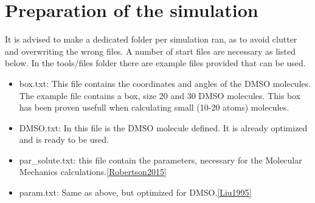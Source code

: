 \documentclass[a4paper,fleqn]{report}
\begin{document}
	
	\section{Preparation of the simulation}
	It is advised to make a dedicated folder per simulation ran, as to avoid 
	clutter and overwriting the wrong files.
	A number of start files are necessary as listed below.
	In the tools/files folder there are example files provided that can be 
	used.
	
	\begin{itemize}
		\item box.txt: This file contains the coordinates and angles of the 
		DMSO molecules. The example file contains a box, size 20 \angstrom and 
		30 DMSO molecules. This box has been proven usefull when calculating 
		small (10-20 atoms) molecules.
		\item DMSO.txt: In this file is the DMSO molecule defined. It is 
		already optimized and is ready to be used.
		\item par\_solute.txt: this file contain the parameters, necessary for 
		the Molecular Mechanics calculations.\ref{Robertson2015}
		\item param.txt: Same as above, but optimized for DMSO.\ref{Liu1995}
	\end{itemize}
	
	
\end{document}
